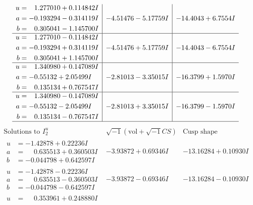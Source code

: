 \documentclass[1p]{elsarticle_modified}
\theoremstyle{definition}
\newcommand{\I}{\sqrt{-1}}
\begin{document}
$$\begin{array}{c|c|c}
\begin{aligned}
u &= \phantom{-}1.277010 + 0.114842 I \\
a &= -0.193294 - 0.314119 I \\
b &= \phantom{-}0.305041 - 1.145700 I\end{aligned}
 & -4.51476 - 5.17759 I & -14.4043 + 6.7554 I \\ \hline\begin{aligned}
u &= \phantom{-}1.277010 - 0.114842 I \\
a &= -0.193294 + 0.314119 I \\
b &= \phantom{-}0.305041 + 1.145700 I\end{aligned}
 & -4.51476 + 5.17759 I & -14.4043 - 6.7554 I \\ \hline\begin{aligned}
u &= \phantom{-}1.340980 + 0.147089 I \\
a &= -0.55132 + 2.05499 I \\
b &= \phantom{-}0.135134 + 0.767547 I\end{aligned}
 & -2.81013 - 3.35015 I & -16.3799 + 1.5970 I \\ \hline\begin{aligned}
u &= \phantom{-}1.340980 - 0.147089 I \\
a &= -0.55132 - 2.05499 I \\
b &= \phantom{-}0.135134 - 0.767547 I\end{aligned}
 & -2.81013 + 3.35015 I & -16.3799 - 1.5970 I\\
 \hline 
 \end{array}$$\newpage$$\begin{array}{c|c|c}  
\text{Solutions to }I^u_{2}& \I (\text{vol} + \sqrt{-1}CS) & \text{Cusp shape}\\
 \hline 
\begin{aligned}
u &= -1.42878 + 0.22236 I \\
a &= \phantom{-}0.635513 + 0.360503 I \\
b &= -0.044798 + 0.642597 I\end{aligned}
 & -3.93872 + 0.69346 I & -13.16284 + 0.10930 I \\ \hline\begin{aligned}
u &= -1.42878 - 0.22236 I \\
a &= \phantom{-}0.635513 - 0.360503 I \\
b &= -0.044798 - 0.642597 I\end{aligned}
 & -3.93872 - 0.69346 I & -13.16284 - 0.10930 I \\ \hline\begin{aligned}
u &= \phantom{-}0.353961 + 0.248880 I \\

\end{aligned}
\end{array}$$
\end{document}
